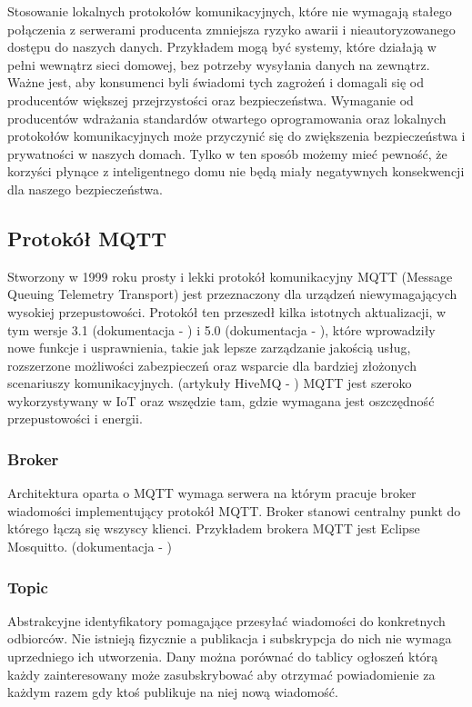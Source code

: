 Stosowanie lokalnych protokołów komunikacyjnych, które nie wymagają stałego połączenia z serwerami producenta zmniejsza ryzyko awarii i nieautoryzowanego dostępu do naszych danych. Przykładem mogą być systemy, które działają w pełni wewnątrz sieci domowej, bez potrzeby wysyłania danych na zewnątrz.\\

Ważne jest, aby konsumenci byli świadomi tych zagrożeń i domagali się od producentów większej przejrzystości oraz bezpieczeństwa. Wymaganie od producentów wdrażania standardów otwartego oprogramowania oraz lokalnych protokołów komunikacyjnych może przyczynić się do zwiększenia bezpieczeństwa i prywatności w naszych domach. Tylko w ten sposób możemy mieć pewność, że korzyści płynące z inteligentnego domu nie będą miały negatywnych konsekwencji dla naszego bezpieczeństwa.

\newpage

\subsection{Protokół MQTT}
Stworzony w 1999 roku prosty i lekki protokół komunikacyjny MQTT (Message Queuing Telemetry Transport) jest przeznaczony dla urządzeń niewymagających wysokiej przepustowości. Protokół ten przeszedł kilka istotnych aktualizacji, w tym wersje 3.1 (dokumentacja - \cite{mqtt3spec}) i 5.0 (dokumentacja - \cite{mqtt5spec}), które wprowadziły nowe funkcje i usprawnienia, takie jak lepsze zarządzanie jakością usług, rozszerzone możliwości zabezpieczeń oraz wsparcie dla bardziej złożonych scenariuszy komunikacyjnych. (artykuły HiveMQ - \cite{mqtt5part1}\cite{mqtt5part2}) MQTT jest szeroko wykorzystywany w IoT oraz wszędzie tam, gdzie wymagana jest oszczędność przepustowości i energii.

\subsubsection{Broker}
Architektura oparta o MQTT wymaga serwera na którym pracuje broker wiadomości implementujący protokół MQTT. Broker stanowi centralny punkt do którego łączą się wszyscy klienci. Przykładem brokera MQTT jest Eclipse Mosquitto. (dokumentacja - \cite{mosquittodocs})

\subsubsection{Topic}
Abstrakcyjne identyfikatory pomagające przesyłać wiadomości do konkretnych odbiorców. Nie istnieją fizycznie a publikacja i subskrypcja do nich nie wymaga uprzedniego ich utworzenia. Dany  można porównać do tablicy ogłoszeń którą każdy zainteresowany może zasubskrybować aby otrzymać powiadomienie za każdym razem gdy ktoś publikuje na niej nową wiadomość.\\

